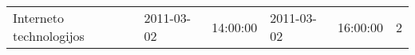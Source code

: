 \begin{tabularx}{\textwidth}{p{6em} X X X X X}
 Interneto technologijos   & 2011-03-02  & 14:00:00   & 2011-03-02 &  16:00:00   & 2\\
\end{tabularx}
